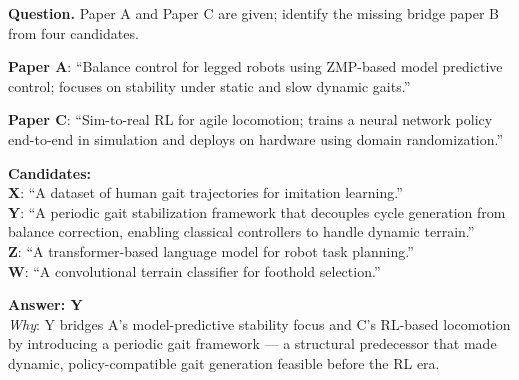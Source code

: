 \begin{tcolorbox}[
    breakable,
    title={Example of T4 · Structural Integrity (T4-06: Missing-Link Recovery)},
    colback=LighterGray,
    colframe=DeepPurple,
    colbacktitle=DeepPurple,
    coltitle=White,
]
\textbf{\textcolor{CaseOrange}{Question.}} Paper A and Paper C are given; identify the missing bridge paper B from four candidates.

\smallskip
\textbf{Paper A}: ``Balance control for legged robots using ZMP-based model predictive control; focuses on stability under static and slow dynamic gaits.''

\textbf{Paper C}: ``Sim-to-real RL for agile locomotion; trains a neural network policy end-to-end in simulation and deploys on hardware using domain randomization.''

\medskip
\textbf{\textcolor{CaseOrange}{Candidates:}}\\
\textbf{X}: ``A dataset of human gait trajectories for imitation learning.''\\
\textbf{Y}: ``A periodic gait stabilization framework that decouples cycle generation from balance correction, enabling classical controllers to handle dynamic terrain.''\\
\textbf{Z}: ``A transformer-based language model for robot task planning.''\\
\textbf{W}: ``A convolutional terrain classifier for foothold selection.''

\medskip
\textbf{\textcolor{CaseBlue}{Answer: Y}}\\
\textit{Why}: Y bridges A's model-predictive stability focus and C's RL-based locomotion by introducing a periodic gait framework — a structural predecessor that made dynamic, policy-compatible gait generation feasible before the RL era.
\end{tcolorbox}

\subsection{\genearena{}}
\label{app:ex_arena}

